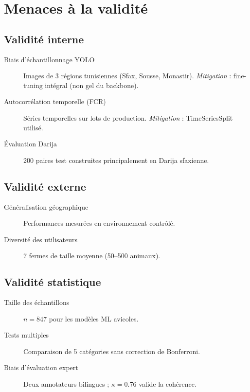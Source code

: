\section{Menaces à la validité}

\subsection{Validité interne}

\begin{description}
  \item[Biais d'échantillonnage YOLO] Images de 3 régions tunisiennes (Sfax, Sousse, Monastir).
        \textit{Mitigation} : fine-tuning intégral (non gel du backbone).
  \item[Autocorrélation temporelle (FCR)] Séries temporelles sur lots de production.
        \textit{Mitigation} : TimeSeriesSplit utilisé.
  \item[Évaluation Darija] 200 paires test construites principalement en Darija sfaxienne.
\end{description}

\subsection{Validité externe}

\begin{description}
  \item[Généralisation géographique] Performances mesurées en environnement contrôlé.
  \item[Diversité des utilisateurs] 7 fermes de taille moyenne (50--500 animaux).
\end{description}

\subsection{Validité statistique}

\begin{description}
  \item[Taille des échantillons] $n = 847$ pour les modèles ML avicoles.
  \item[Tests multiples] Comparaison de 5 catégories sans correction de Bonferroni.
  \item[Biais d'évaluation expert] Deux annotateurs bilingues ; $\kappa = 0.76$ valide la cohérence.
\end{description}

